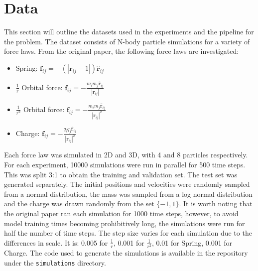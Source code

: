 \documentclass[11pt]{article}
\begin{document}
\section{Data}
This section will outline the datasets used in the experiments and the pipeline for the problem. The dataset consists of N-body particle simulations for a variety of force laws. From the original paper, the following force laws are investigated:
\begin{itemize}
    \item Spring: \(\textbf{f}_{ij} = -(|\textbf{r}_{ij} - 1|) \hat{\textbf{r}}_{ij}\)
    \item \(\frac{1}{r}\) Orbital force: \(\textbf{f}_{ij} = -\frac{m_i m_j\hat{\textbf{r}}_{ij}}{|\textbf{r}_{ij}|}\)
    \item \(\frac{1}{r^2}\) Orbital force: \(\textbf{f}_{ij} = -\frac{m_i m_j \hat{\textbf{r}}_{ij}}{|\textbf{r}_{ij}|^2}\)
    \item Charge: \(\textbf{f}_{ij} = -\frac{q_i q_j \hat{\textbf{r}}_{ij}}{|\textbf{r}_{ij}|^2}\)
\end{itemize}
Each force law was simulated in 2D and 3D, with 4 and 8 particles respectively. For each experiment, 10000 simulations were run in parallel for 500 time steps. This was split 3:1 to obtain the training and validation set. The test set was generated separately. The initial positions and velocities were randomly sampled from a normal distribution, the mass was sampled from a log normal distribution and the charge was drawn randomly from the set \(\{-1, 1\}\). 
It is worth noting that the original paper ran each simulation for 1000 time steps, however, to avoid model training times becoming prohibitively long, the simulations were run for half the number of time steps. The step size varies for each simulation due to the differences in scale. It is: 0.005 for \( \frac{1}{r} \), 0.001 for \( \frac{1}{r^2} \), 0.01 for Spring, 0.001 for Charge. The code used to generate the simulations is available in the repository under the \texttt{simulations} directory. 
\end{document}
